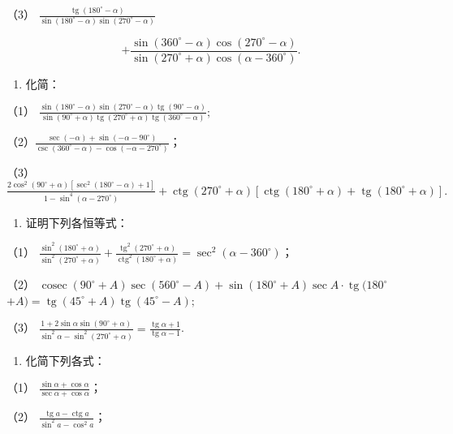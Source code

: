 （3）
\(\frac{\operatorname{tg}(180^{\circ} - \alpha)}{\sin(180^{\circ} - \alpha)\sin(270^{\circ} - \alpha)}\)

\[
+ \frac {\sin (360 ^{\circ} - \alpha) \cos (270 ^{\circ} - \alpha)}{\sin (270 ^{\circ} + \alpha) \cos (\alpha - 360 ^{\circ})}.
\]

\begin{enumerate}[start=5]
\item
  化简：
\end{enumerate}

（1）
\(\frac{\sin(180^{\circ} - \alpha)\sin(270^{\circ} - \alpha)\operatorname{tg}(90^{\circ} - \alpha)}{\sin(90^{\circ} + \alpha)\operatorname{tg}(270^{\circ} + \alpha)\operatorname{tg}(360^{\circ} - \alpha)};\)

（2）\(\frac{\sec(-\alpha)+\sin(-\alpha-90^\circ)}{\csc(360^\circ-\alpha)-\cos(-\alpha-270^\circ)}\)；

（3）
\(\frac{2\cos^2(90^\circ + \alpha)[\sec^2(180^\circ - \alpha) + 1]}{1 - \sin^4(\alpha - 270^\circ)} + \operatorname{ctg}(270^\circ + \alpha)[\operatorname{ctg}(180^\circ + \alpha) + \operatorname{tg}(180^\circ + \alpha)].\)

\begin{enumerate}[start=6]
\item
  证明下列各恒等式：
\end{enumerate}

（1）
\(\frac{\sin^2(180^\circ + \alpha)}{\sin^2(270^\circ + \alpha)} + \frac{\operatorname{tg}^2(270^\circ + \alpha)}{\operatorname{ctg}^2(180^\circ + \alpha)} = \sec^2(\alpha - 360^\circ)\)；

（2）
\(\operatorname{cosec} (90^{\circ} + A)\sec (560^{\circ} - A) + \sin (180^{\circ} + A)\sec A\cdot \operatorname {tg}(180^{\circ}\)
\(+A) = \operatorname {tg}(45^{\circ} + A)\operatorname {tg}(45^{\circ} - A);\)

（3）
\(\frac{1 + 2\sin\alpha\sin(90^{\circ} + \alpha)}{\sin^{2}\alpha - \sin^{2}(270^{\circ} + \alpha)} = \frac{\operatorname{tg}\alpha + 1}{\operatorname{tg}\alpha - 1}\).

\begin{enumerate}[start=7]
\item
  化简下列各式：
\end{enumerate}

（1） \(\frac{\sin\alpha + \cos\alpha}{\sec\alpha + \cos\alpha}\)；

（2）
\(\frac{\operatorname{tg} a - \operatorname{ctg} a}{\sin^2 a - \cos^2 a}\)；

